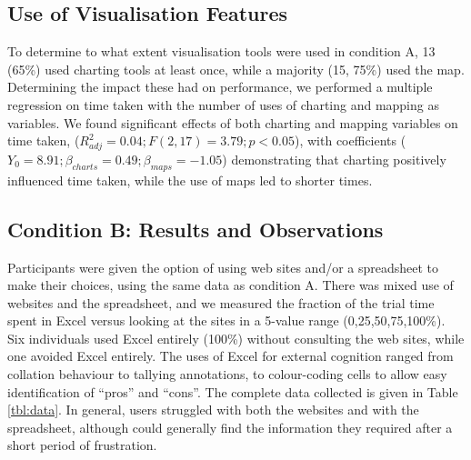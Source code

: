 \documentclass{sigchi}
\begin{document}
\subsection{Use of Visualisation Features}
To determine to what extent visualisation tools were used in condition A, 13 (65\%) used charting tools at least once, while a majority (15, 75\%) used the map.  Determining the impact these had on performance, we performed a multiple regression on time taken with the number of uses of charting and mapping as variables.   We found significant effects of both charting and mapping variables on time taken, ($R^2_{adj} = 0.04; F(2,17)=3.79; p<0.05$), with coefficients ($Y_0=8.91;\beta_{charts}=0.49;\beta_{maps}=-1.05$) demonstrating that charting positively influenced time taken, while the use of maps led to shorter times.

\subsection{Condition B: Results and Observations}
Participants were given the option of using web sites and/or a spreadsheet to make their choices, using the same data as condition A. There was mixed use of websites and the spreadsheet, and we measured the fraction of the trial time spent in Excel versus looking at the sites in a 5-value range (0,25,50,75,100\%).  Six individuals used Excel entirely (100\%) without consulting the web sites, while one avoided Excel entirely. The uses of Excel for external cognition ranged from collation behaviour to tallying annotations, to colour-coding cells to allow easy identification of  ``pros'' and ``cons''.  The complete data collected is given in Table \ref{tbl:data}. In general, users struggled with both the websites and with the spreadsheet, although could generally find the information they required after a short period of frustration. 



\end{document}
